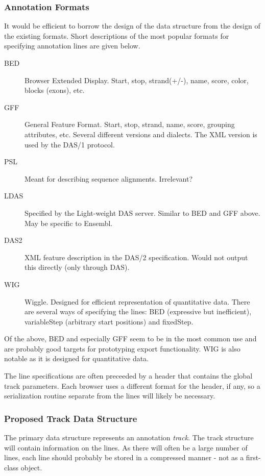 \documentclass{article}
\begin{document}
\subsubsection*{Annotation Formats}
\label{sec:formats}

It would be efficient to borrow the design of the data structure from
the design of the existing formats. Short descriptions of the most
popular formats for specifying annotation lines are given below.
\begin{description}
\item[BED] Browser Extended Display. Start, stop, strand(+/-), name,
score, color, blocks (exons), etc.
\item[GFF] General Feature Format. Start, stop, strand, name, score,
grouping attributes, etc. Several different versions and dialects. The
XML version is used by the DAS/1 protocol.
\item[PSL] Meant for describing sequence alignments. Irrelevant?
\item[LDAS] Specified by the Light-weight DAS server. Similar to BED
and GFF above. May be specific to Ensembl.
\item[DAS2] XML feature description in the DAS/2 specification. Would
not output this directly (only through DAS).
\item[WIG] Wiggle. Designed for efficient representation of
quantitative data. There are several ways of specifying the lines: BED
(expressive but inefficient), variableStep (arbitrary start positions)
and fixedStep. 
\end{description}
Of the above, BED and especially GFF seem to be in the most common use
and are probably good targets for prototyping export functionality.
WIG is also notable as it is designed for quantitative data.

The line specifications are often preceeded by a header that contains
the global track parameters. Each browser uses a different format for
the header, if any, so a serialization routine separate from the lines
will likely be necessary.

\subsubsection*{Proposed Track Data Structure}
\label{sec:proposed-structures}

The primary data structure represents an annotation \emph{track}. The
track structure will contain information on the lines. As there will
often be a large number of lines, each line should probably be stored
in a compressed manner - not as a first-class object.
\end{document}

